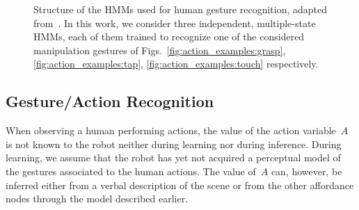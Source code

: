 \newcommand{\myscalefactor}{0.8}

\newcommand{\shapeOfHmmState}{circle} %

\newcommand{\standardhmm}[1]{
    \node[draw,\shapeOfHmmState] (hmm#1s1) {$s_1$};
    \node[draw,\shapeOfHmmState, right of=hmm#1s1] (hmm#1s2) {$s_2$};
    \node[\shapeOfHmmState, right of=hmm#1s2] (hmm#1s3) {\dots};
    \node[draw,\shapeOfHmmState, right of=hmm#1s3] (hmm#1s4) {$s_Q$};
    \node[left of=hmm#1s1]  (invisible1) {};
    \node[right of=hmm#1s4] (invisible2) {};
    \path[->] (hmm#1s1) edge (hmm#1s2);
    \path[loop above] (hmm#1s1) edge (hmm#1s1);
    \path[->] (hmm#1s2) edge (hmm#1s3);
    \path[loop above] (hmm#1s2) edge (hmm#1s2);
    \path[dashed] (hmm#1s2) -- (hmm#1s3);
    \path[->] (hmm#1s3) edge (hmm#1s4);
    \path[loop above] (hmm#1s4) edge (hmm#1s4);
    \path[->] (invisible1) edge (hmm#1s1);
    \path[->] (hmm#1s4) edge (invisible2);
}

\newcommand{\modeltwo}{
}

\begin{figure}
  \centering
  \modeltwo
  \caption{Structure of the \acp{HMM} used for human gesture recognition, adapted from~\cite{saponaro:2013:crhri}. In this work, we consider three independent, multiple-state \acp{HMM}, each of them trained to recognize one of the considered manipulation gestures of Figs.~\ref{fig:action_examples:grasp}, \ref{fig:action_examples:tap}, \ref{fig:action_examples:touch} respectively.}
  \label{fig:hmms}
\end{figure}

\subsection{Gesture/Action Recognition}
When observing a human performing actions, the value of the action variable~$A$ is not known to the robot neither during learning nor during inference.
During learning, we assume that the robot has yet not acquired a perceptual model of the gestures associated to the human actions.
The value of~$A$ can, however, be inferred either from a verbal description of the scene or from the other affordance nodes through the \AffWords{} model described earlier.

